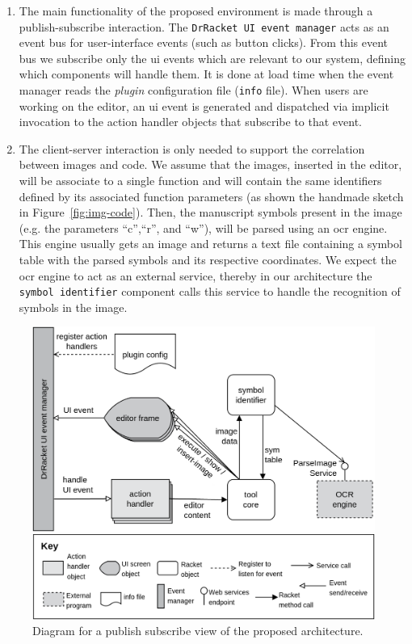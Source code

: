 \begin{enumerate}
	\item The main functionality of the proposed environment is made through a publish-subscribe interaction. The \texttt{DrRacket UI event manager} acts as an event bus for user-interface events (such as button clicks). From this event bus we subscribe only the \ac{ui} events which are relevant to our system, defining which components will handle them. It is done at load time when the event manager reads the \textit{plugin} configuration file (\texttt{info} file). When users are working on the editor, an \ac{ui} event is generated and dispatched via implicit invocation to the action handler objects that subscribe to that event.

	\item The client-server interaction is only needed to support the correlation between images and code. We assume that the images, inserted in the editor, will be associate to a single function and will contain the same identifiers defined by its associated function parameters (as shown the handmade sketch in Figure~\ref{fig:img-code}). Then, the manuscript symbols present in the image (e.g. the parameters ``c'',``r'', and ``w''), will be parsed using an \ac{ocr} engine. This engine usually gets an image and returns a text file containing a symbol table with the parsed symbols and its respective coordinates. We expect the \ac{ocr} engine to act as an external service, thereby in our architecture the \texttt{symbol identifier} component calls this service to handle the recognition of symbols in the image.
\end{enumerate}

\begin{figure}[htb]
 \vspace{-15pt}
	\centering
	\includegraphics[scale=0.19]{img/solution}
	\vspace{-5pt}
	\caption{Diagram for a publish subscribe view of the proposed architecture.}
	\label{fig:solution}
 \vspace{-10pt}
\end{figure}

